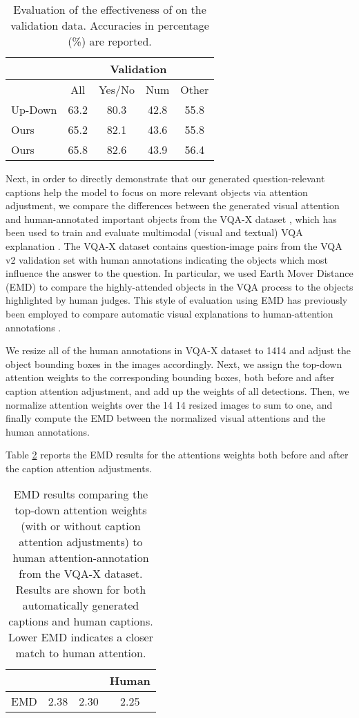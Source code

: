 \documentclass[11pt,a4paper]{article}
\begin{document}
\begin{table}[h]
\centering
\begin{tabular}{l|cccc}
\hline\toprule
                  & \multicolumn{4}{c}{Validation} \\  \hline
                  & {\footnotesize All }   & {\footnotesize Yes/No}  & {\footnotesize Num}   & {\footnotesize Other}  \\ \hline\hline
Up-Down  & 63.2  & 80.3    & 42.8 & 55.8   \\
Ours   & 65.2  &  82.1 & 43.6 & 55.8\\
Ours  &  65.8   &  82.6&  43.9& 56.4\\\bottomrule
\end{tabular}
\caption{Evaluation of the effectiveness of  on the validation data. Accuracies in percentage (\%) are reported.}
\label{tab:relationship1}
\end{table}

Next, in order to directly demonstrate that our generated question-relevant captions help the model to focus on more relevant objects via attention adjustment, we compare the differences between the generated visual attention and human-annotated important objects from the VQA-X dataset \cite{park2018multimodal}, which has been used to train and evaluate multimodal (visual and textual) VQA explanation \cite{wu2018faithful}. The VQA-X dataset contains  question-image pairs from the VQA v2 validation set with human annotations indicating the objects which most influence the answer to the question. In particular, we used Earth Mover Distance (EMD) \cite{rubner2000earth} to compare the highly-attended objects in the VQA process to the objects highlighted by human judges.
This style of evaluation using EMD has previously been employed to compare automatic visual explanations to human-attention annotations \cite{selvaraju2017grad,park2018multimodal}.

We resize all of the  human annotations in VQA-X dataset to 1414 and adjust the object bounding boxes in the images accordingly. Next, we assign the top-down attention weights to the corresponding bounding boxes, both before and after caption attention adjustment, and add up the weights of all  detections. Then, we normalize attention weights over the 14  14 resized images to sum to one, and finally compute the EMD between the normalized visual attentions and the human annotations.

Table \ref{tab:emd} reports the EMD results for the attentions weights both before and after the caption attention adjustments. 
\begin{table}[!h]
\centering
\begin{tabular}{l|c|c|c}
\hline \toprule
     &    &  & Human  \\\hline
EMD  & 2.38  & 2.30    & 2.25    \\\bottomrule
\end{tabular}
\caption{EMD results comparing the top-down attention weights (with or without caption attention adjustments) to human attention-annotation from the VQA-X dataset. Results are shown for both automatically generated captions and human captions. Lower EMD indicates a closer match to human attention.}
\label{tab:emd}
\end{table}
\end{document}
